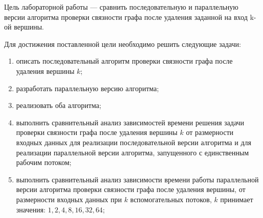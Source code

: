 
Цель лабораторной работы --- сравнить последовательную и параллельную версии алгоритма проверки связности графа после удаления заданной на вход k-ой вершины.



Для достижения поставленной цели необходимо решить следующие задачи:
\begin{enumerate}
	\item описать последовательный алгоритм проверки связности графа после удаления вершины $k$;
	\item разработать параллельную версию алгоритма;
	\item реализовать оба алгоритма;
	\item выполнить сравнительный анализ зависимостей времени решения задачи проверки связности графа после удаления вершины $k$ от размерности входных данных для реализации последовательной версии алгоритма и для реализации параллельной версии алгоритма, запущенного с единственным рабочим потоком;
	\item выполнить сравнительный анализ зависимости времени работы параллельной версии алгоритма проверки связности графа после удаления вершины, от размерности входных данных при $k$ вспомогательных потоков, $k$ принимает значения: $1, 2, 4, 8, 16, 32, 64$;
\end{enumerate}

\clearpage
